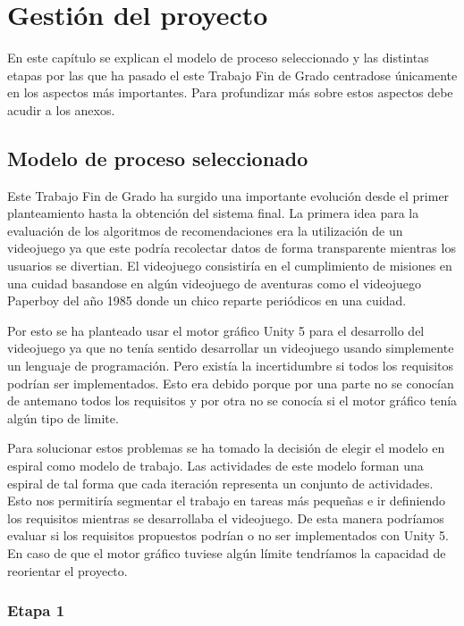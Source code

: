 \chapter{Gestión del proyecto}


En este capítulo se explican el modelo de proceso seleccionado y las distintas etapas por las que ha pasado el este Trabajo Fin de Grado centradose únicamente en los aspectos más importantes. Para profundizar más sobre estos aspectos debe acudir a los anexos.

\section{Modelo de proceso seleccionado}


Este Trabajo Fin de Grado ha surgido una importante evolución desde el primer planteamiento hasta la obtención del sistema final. La primera idea para la evaluación de los algoritmos de recomendaciones era la utilización de un videojuego ya que este podría recolectar datos de forma transparente mientras los usuarios se divertian. El videojuego consistiría en el cumplimiento de misiones en una cuidad basandose en algún videojuego de aventuras como el videojuego Paperboy del año 1985 donde un chico reparte periódicos en una cuidad.

Por esto se ha planteado usar el motor gráfico Unity 5 para el desarrollo del videojuego ya que no tenía sentido desarrollar un videojuego usando simplemente un lenguaje de programación. Pero existía la incertidumbre si todos los requisitos podrían ser implementados. Esto era debido porque por una parte no se conocían de antemano todos los requisitos y por otra no se conocía si el motor gráfico tenía algún tipo de limite. 

Para solucionar estos problemas se ha tomado la decisión de elegir el modelo en espiral como modelo de trabajo. Las actividades de este modelo forman una espiral de tal forma que cada iteración representa un conjunto de actividades. Esto nos permitiría segmentar el trabajo en tareas más pequeñas e ir definiendo los requisitos mientras se desarrollaba el videojuego. De esta manera podríamos evaluar si los requisitos propuestos podrían o no ser implementados con Unity 5. En caso de que el motor gráfico tuviese algún límite tendríamos la capacidad de reorientar el proyecto.

\subsection{Etapa 1}


